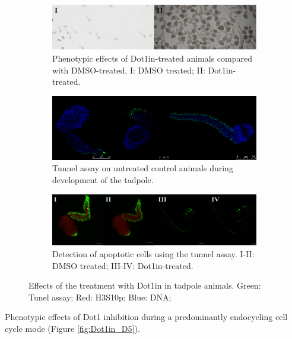 \documentclass[11pt,twoside,a4paper]{report}
\begin{document}
	\begin{figure}
		\centering
		\begin{subfigure}{1\textwidth}
			\centering
			\includegraphics[width=1\linewidth]{pngs/tb_phenotype.png}
			\caption{
				Phenotypic effects of Dot1in-treated animals compared with DMSO-treated.
				{\footnotesize
					I: DMSO treated;
					II: Dot1in-treated.
				}
			}
		\end{subfigure}
		\begin{subfigure}{1\textwidth}
			\centering
			\includegraphics[width=1\linewidth]{pngs/tb_tunnel.png}
			\caption{Tunnel assay on untreated control animals during development of the tadpole.}
		\end{subfigure}
		\begin{subfigure}{1\textwidth}
			\centering
			\includegraphics[width=1\linewidth]{pngs/tb_dot1in.png}
			\caption{
				Detection of apoptotic cells using the tunnel assay.
				{\footnotesize
					I-II: DMSO treated;
					III-IV: Dot1in-treated.
				}
			}
		\end{subfigure}
		\caption{
			Effects of the treatment with Dot1in in tadpole animals.
			Green: Tunel assay;
			Red: H3S10p;
			Blue: DNA;
		}
		\label{fig:Dot1in_TB}
	\end{figure}
	
	Phenotypic effects of Dot1 inhibition during a predominantly endocycling cell cycle mode (Figure \ref{fig:Dot1in_D5}).	
	
\end{document}
